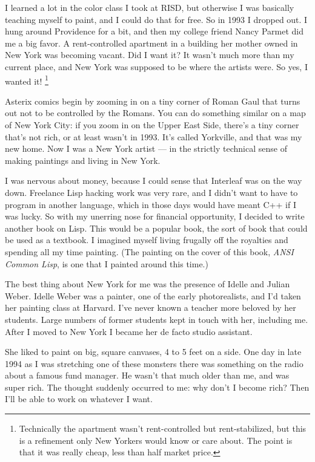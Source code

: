 \documentclass[12pt]{book}
\begin{document}
I learned a lot in the color class I took at RISD, but otherwise I was
basically teaching myself to paint, and I could do that for free. So in
1993 I dropped out. I hung around Providence for a bit, and then my
college friend Nancy Parmet did me a big favor. A rent-controlled
apartment in a building her mother owned in New York was becoming
vacant. Did I want it? It wasn't much more than my current place, and
New York was supposed to be where the artists were. So yes, I wanted it!
\footnote{Technically the apartment wasn't rent-controlled but
rent-stabilized, but this is a refinement only New Yorkers would know or
care about. The point is that it was really cheap, less than half market
price.}

Asterix comics begin by zooming in on a tiny corner of Roman Gaul that
turns out not to be controlled by the Romans. You can do something
similar on a map of New York City: if you zoom in on the Upper East
Side, there's a tiny corner that's not rich, or at least wasn't in 1993.
It's called Yorkville, and that was my new home. Now I was a New York
artist --- in the strictly technical sense of making paintings and
living in New York.

I was nervous about money, because I could sense that Interleaf was on
the way down. Freelance Lisp hacking work was very rare, and I didn't
want to have to program in another language, which in those days would
have meant C++ if I was lucky. So with my unerring nose for financial
opportunity, I decided to write another book on Lisp. This would be a
popular book, the sort of book that could be used as a textbook. I
imagined myself living frugally off the royalties and spending all my
time painting. (The painting on the cover of this book, \emph{ANSI
Common Lisp}, is one that I painted around this time.)

The best thing about New York for me was the presence of Idelle and
Julian Weber. Idelle Weber was a painter, one of the early
photorealists, and I'd taken her painting class at Harvard. I've never
known a teacher more beloved by her students. Large numbers of former
students kept in touch with her, including me. After I moved to New York
I became her de facto studio assistant.

She liked to paint on big, square canvases, 4 to 5 feet on a side. One
day in late 1994 as I was stretching one of these monsters there was
something on the radio about a famous fund manager. He wasn't that much
older than me, and was super rich. The thought suddenly occurred to me:
why don't I become rich? Then I'll be able to work on whatever I want.
\end{document}

